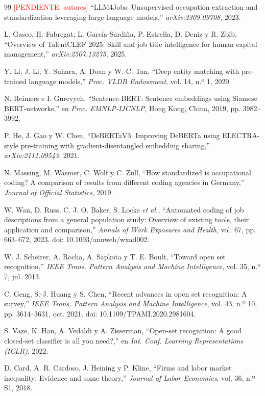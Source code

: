 \documentclass[12pt,a4paper,oneside]{report}
\newcommand{\pend}[1]{\textcolor{red}{\small[PENDIENTE: #1]}}
\begin{document}
\begin{thebibliography}{99}
\pend{autores} ``LLM4Jobs: Unsupervised occupation extraction and standardization
leveraging large language models,'' \emph{arXiv:2309.09708}, 2023.

L. Gasco, H. Fabregat, L. García-Sardiña, P. Estrella, D. Deniz y R. Zbib, ``Overview of
TalentCLEF 2025: Skill and job title intelligence for human capital management,''
\emph{arXiv:2507.13275}, 2025.

Y. Li, J. Li, Y. Suhara, A. Doan y W.-C. Tan, ``Deep entity matching with pre-trained
language models,'' \emph{Proc. VLDB Endowment}, vol. 14, n.º 1, 2020.

N. Reimers e I. Gurevych, ``Sentence-BERT: Sentence embeddings using Siamese
BERT-networks,'' en \emph{Proc. EMNLP-IJCNLP}, Hong Kong, China, 2019, pp. 3982--3992.

P. He, J. Gao y W. Chen, ``DeBERTaV3: Improving DeBERTa using ELECTRA-style pre-training
with gradient-disentangled embedding sharing,'' \emph{arXiv:2111.09543}, 2021.

N. Massing, M. Wasmer, C. Wolf y C. Züll, ``How standardized is occupational coding? A
comparison of results from different coding agencies in Germany,'' \emph{Journal of
Official Statistics}, 2019.

W. Wan, D. Russ, C. J. O. Baker, S. Locke \emph{et al.}, ``Automated coding of job
descriptions from a general population study: Overview of existing tools, their
application and comparison,'' \emph{Annals of Work Exposures and Health}, vol. 67,
pp. 663--672, 2023. doi: 10.1093/annweh/wxad002.

W. J. Scheirer, A. Rocha, A. Sapkota y T. E. Boult, ``Toward open set recognition,''
\emph{IEEE Trans. Pattern Analysis and Machine Intelligence}, vol. 35, n.º 7, jul. 2013.

C. Geng, S.-J. Huang y S. Chen, ``Recent advances in open set recognition: A survey,''
\emph{IEEE Trans. Pattern Analysis and Machine Intelligence}, vol. 43, n.º 10,
pp. 3614--3631, oct. 2021. doi: 10.1109/TPAMI.2020.2981604.

S. Vaze, K. Han, A. Vedaldi y A. Zisserman, ``Open-set recognition: A good closed-set
classifier is all you need?,'' en \emph{Int. Conf. Learning Representations (ICLR)}, 2022.

D. Card, A. R. Cardoso, J. Heining y P. Kline, ``Firms and labor market inequality:
Evidence and some theory,'' \emph{Journal of Labor Economics}, vol. 36, n.º S1, 2018.

\end{thebibliography}
\end{document}
